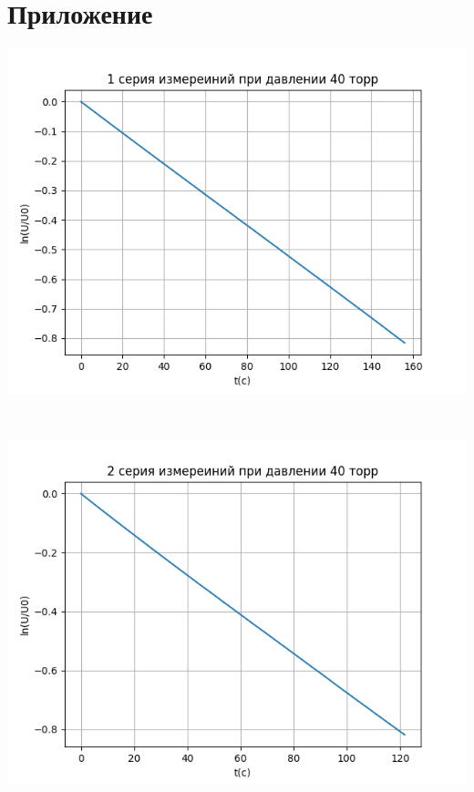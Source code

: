 \section{Приложение}
\begin{minipage}{0.47\textwidth}
  \includegraphics[width=1\linewidth]{pic/40_1.png}
\end{minipage}
\begin{minipage}{0.04\textwidth}
\
\end{minipage}
\begin{minipage}{0.47\textwidth}
 \includegraphics[width=1\linewidth]{pic/40_2.png}
\end{minipage}
\\
\
\\
\\

